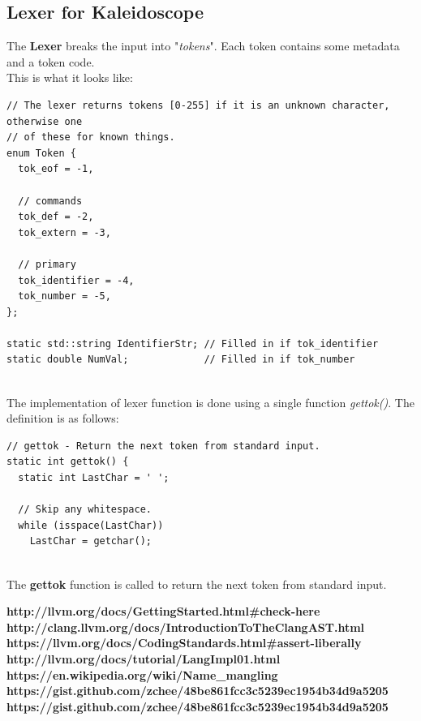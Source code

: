 \documentclass{article}
\begin{document}
\subsection{Lexer for Kaleidoscope}
The \textbf{Lexer} breaks the input into "\textit{tokens}". Each token contains some metadata and a token code.\\
This is what it looks like:

\begin{verbatim}
// The lexer returns tokens [0-255] if it is an unknown character, otherwise one
// of these for known things.
enum Token {
  tok_eof = -1,

  // commands
  tok_def = -2,
  tok_extern = -3,

  // primary
  tok_identifier = -4,
  tok_number = -5,
};

static std::string IdentifierStr; // Filled in if tok_identifier
static double NumVal;             // Filled in if tok_number
\end{verbatim}
\\
The implementation of lexer function is done using a single function \textit{gettok()}. The definition is as follows:
\begin{verbatim}
// gettok - Return the next token from standard input.
static int gettok() {
  static int LastChar = ' ';

  // Skip any whitespace.
  while (isspace(LastChar))
    LastChar = getchar();
\end{verbatim}
\\
The \textbf{gettok} function is called to return the next token from standard input.



\textbf{http://llvm.org/docs/GettingStarted.html#check-here}\\
\textbf{http://clang.llvm.org/docs/IntroductionToTheClangAST.html}\\
\textbf{https://llvm.org/docs/CodingStandards.html#assert-liberally}\\
\textbf{http://llvm.org/docs/tutorial/LangImpl01.html}\\
\textbf{https://en.wikipedia.org/wiki/Name\_mangling}\\
\textbf{https://gist.github.com/zchee/48be861fcc3c5239ec1954b34d9a5205}\\
\textbf{https://gist.github.com/zchee/48be861fcc3c5239ec1954b34d9a5205}
\end{document}
